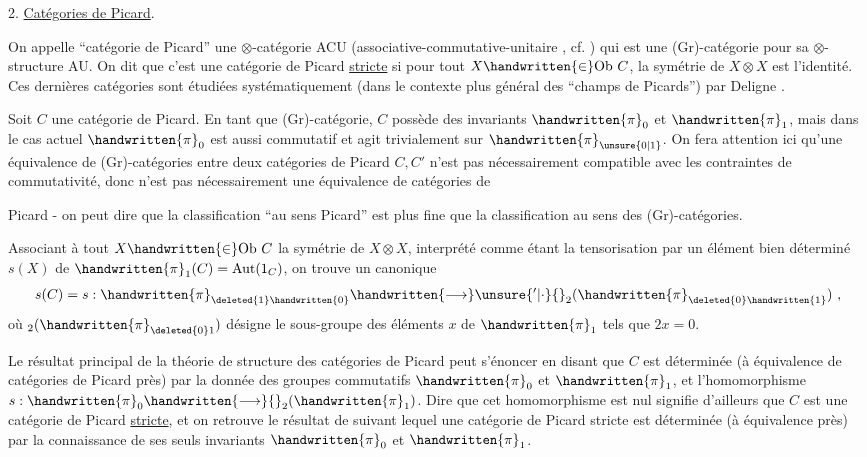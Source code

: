 2. \uline{Catégories de Picard}.

On appelle ``catégorie de Picard'' une $\otimes$-catégorie ACU (associative-commutative-unitaire , cf. \handwritten{[\, ]}) qui est une (Gr)-catégorie pour sa  $\otimes$-structure AU. On dit que c'est une catégorie de Picard \uline{stricte} si pour tout $X\handwritten{\in}\mathrm{Ob}\ C$, la symétrie de $X\otimes X$ est l'identité. Ces  dernières catégories sont étudiées systématiquement (dans le contexte plus général des ``champs de Picards'') par Deligne \handwritten{[\, ]}.

Soit $C$ une catégorie de Picard. En tant que (Gr)-catégorie, $C$ possède des invariants $\handwritten{\pi}_{0}$ et $\handwritten{\pi}_{1}$, mais dans le cas actuel $\handwritten{\pi}_{0}$ est aussi commutatif et agit trivialement sur $\handwritten{\pi}_{\unsure{0|1}}$. On fera attention ici qu'une équivalence de (Gr)-catégories entre deux catégories de Picard $C,C'$ n'est pas nécessairement compatible avec les contraintes de commutativité, donc n'est pas nécessairement une équivalence de catégories de

Picard - on peut dire que la classification ``au sens Picard'' est plus fine que la classification au sens des (Gr)-catégories. 

Associant à tout $X\handwritten{\in}\mathrm{Ob}\ C$ la symétrie de $X\otimes X$, interprété comme  étant la tensorisation par un élément bien déterminé $s(X)$ de $\handwritten{\pi}_{1}(C)=\mathrm{Aut}(1_C)$, on trouve un  canonique
\[
s(C)=s:\handwritten{\pi}_{\deleted{1}\handwritten{0}}\handwritten{\longrightarrow}\unsure{{}'|\cdot}{}_{2}(\handwritten{\pi}_{\deleted{0}\handwritten{1}})\ ,
\]
où $ {}_{2}(\handwritten{\pi}_{\deleted{0}1})$ désigne le sous-groupe des éléments $x$ de $\handwritten{\pi}_{1}$ tels que $2x=0$.

Le résultat principal de la théorie de structure des catégories de Picard peut s'énoncer en disant que $C$ est déterminée (à équivalence  de catégories de Picard près) par la donnée des groupes commutatifs $\handwritten{\pi}_{0}$ et $\handwritten{\pi}_{1}$, et l'homomorphisme $s:\handwritten{\pi}_{0}\handwritten{\longrightarrow}{}_{2}(\handwritten{\pi}_{1})$. Dire que cet homomorphisme est nul signifie d'ailleurs que $C$ est une catégorie de Picard \uline{stricte}, et on retrouve le résultat de \handwritten{[\, ]} suivant lequel une catégorie de Picard stricte est déterminée (à équivalence près) par la connaissance de ses seuls invariants $\handwritten{\pi}_{0}$ et $\handwritten{\pi}_{1}$.


